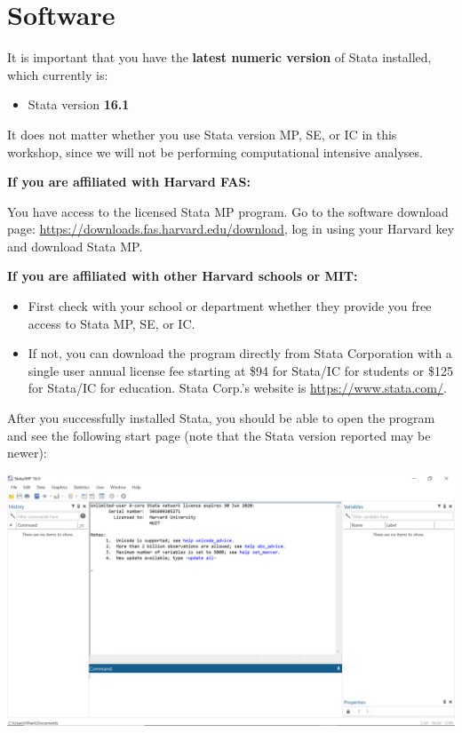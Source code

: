 \documentclass[
]{book}
\providecommand{\tightlist}{%
  \setlength{\itemsep}{0pt}\setlength{\parskip}{0pt}}
\begin{document}
\hypertarget{software-2}{%
\section{Software}\label{software-2}}

It is important that you have the \textbf{latest numeric version} of Stata installed, which currently is:

\begin{itemize}
\tightlist
\item
  Stata version \textbf{16.1}
\end{itemize}

It does not matter whether you use Stata version MP, SE, or IC in this workshop, since we will not be performing computational intensive analyses.

\textbf{If you are affiliated with Harvard FAS:}

You have access to the licensed Stata MP program. Go to the software download page: \url{https://downloads.fas.harvard.edu/download}, log in using your Harvard key and download Stata MP.

\textbf{If you are affiliated with other Harvard schools or MIT:}

\begin{itemize}
\tightlist
\item
  First check with your school or department whether they provide you free access to Stata MP, SE, or IC.
\item
  If not, you can download the program directly from Stata Corporation with a single user annual license fee starting at \$94 for Stata/IC for students or \$125 for Stata/IC for education. Stata Corp.'s website is \url{https://www.stata.com/}.
\end{itemize}

\begin{alert}

After you successfully installed Stata, you should be able to open the program and see the following start page (note that the Stata version reported may be newer):

\end{alert}

\includegraphics{Stata/StataInstall/images/Stata_start_panel.png}
\end{document}
